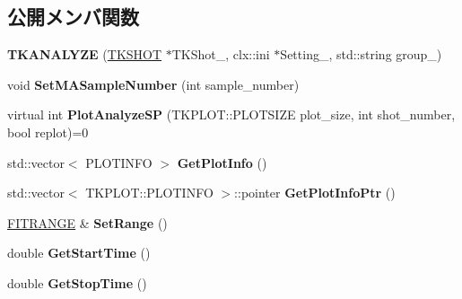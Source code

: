 \subsection*{公開メンバ関数}
\begin{DoxyCompactItemize}
\item 
\mbox{\label{class_t_k_a_n_a_l_y_z_e_ac522bb7549f5e2329a8de8de2b2b2d8a}} 
{\bfseries T\+K\+A\+N\+A\+L\+Y\+ZE} (\hyperlink{class_t_k_s_h_o_t}{T\+K\+S\+H\+OT} $\ast$T\+K\+Shot\+\_\+, clx\+::ini $\ast$Setting\+\_\+, std\+::string group\+\_\+)
\item 
\mbox{\label{class_t_k_a_n_a_l_y_z_e_a597c5a215fdb450ba3e169c2487cb3ed}} 
void {\bfseries Set\+M\+A\+Sample\+Number} (int sample\+\_\+number)
\item 
\mbox{\label{class_t_k_a_n_a_l_y_z_e_ae49ffac275bc42e4d01d4100e55a8f13}} 
virtual int {\bfseries Plot\+Analyze\+SP} (T\+K\+P\+L\+O\+T\+::\+P\+L\+O\+T\+S\+I\+ZE plot\+\_\+size, int shot\+\_\+number, bool replot)=0
\item 
\mbox{\label{class_t_k_a_n_a_l_y_z_e_abcaf46784a1be43930c1909f5ce122aa}} 
std\+::vector$<$ P\+L\+O\+T\+I\+N\+FO $>$ {\bfseries Get\+Plot\+Info} ()
\item 
\mbox{\label{class_t_k_a_n_a_l_y_z_e_a7a1898bb5c3959ba18cf4b6cb22557a5}} 
std\+::vector$<$ T\+K\+P\+L\+O\+T\+::\+P\+L\+O\+T\+I\+N\+FO $>$\+::pointer {\bfseries Get\+Plot\+Info\+Ptr} ()
\item 
\mbox{\label{class_t_k_a_n_a_l_y_z_e_aa3c73c920679675b1a99bf2c0a3dfc1b}} 
\hyperlink{class_t_k_a_n_a_l_y_z_e_1_1_f_i_t_r_a_n_g_e}{F\+I\+T\+R\+A\+N\+GE} \& {\bfseries Set\+Range} ()
\item 
\mbox{\label{class_t_k_a_n_a_l_y_z_e_ac46755c0c97570a8b2f9fee8abe0098a}} 
double {\bfseries Get\+Start\+Time} ()
\item 
\mbox{\label{class_t_k_a_n_a_l_y_z_e_a07e65d7e0e9a7ca58f73432b44541a47}} 
double {\bfseries Get\+Stop\+Time} ()
\item 
\mbox{\label{class_t_k_a_n_a_l_y_z_e_aa26fd364fff1d69ead56a53d1d2de439}} 

\end{DoxyCompactItemize}
